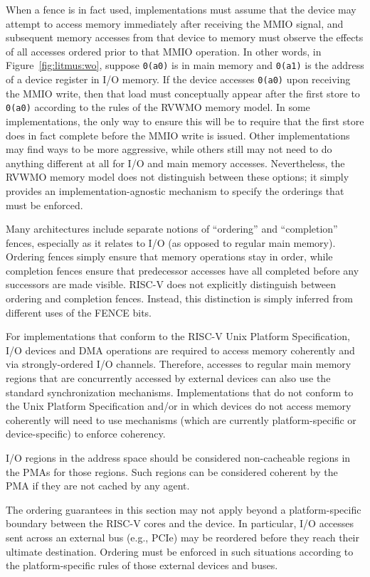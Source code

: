 When a fence is in fact used, implementations must assume that the device may attempt to access memory immediately after receiving the MMIO signal, and subsequent memory accesses from that device to memory must observe the effects of all accesses ordered prior to that MMIO operation.
In other words, in Figure~\ref{fig:litmus:wo}, suppose {\tt 0(a0)} is in main memory and {\tt 0(a1)} is the address of a device register in I/O memory.
If the device accesses {\tt 0(a0)} upon receiving the MMIO write, then that load must conceptually appear after the first store to {\tt 0(a0)} according to the rules of the RVWMO memory model.
In some implementations, the only way to ensure this will be to require that the first store does in fact complete before the MMIO write is issued.
Other implementations may find ways to be more aggressive, while others still may not need to do anything different at all for I/O and main memory accesses.
Nevertheless, the RVWMO memory model does not distinguish between these options; it simply provides an implementation-agnostic mechanism to specify the orderings that must be enforced.

Many architectures include separate notions of ``ordering'' and ``completion'' fences, especially as it relates to I/O (as opposed to regular main memory).
Ordering fences simply ensure that memory operations stay in order, while completion fences ensure that predecessor accesses have all completed before any successors are made visible.
RISC-V does not explicitly distinguish between ordering and completion fences.
Instead, this distinction is simply inferred from different uses of the FENCE bits.

For implementations that conform to the RISC-V Unix Platform Specification, I/O devices and DMA operations are required to access memory coherently and via strongly-ordered I/O channels.
Therefore, accesses to regular main memory regions that are concurrently accessed by external devices can also use the standard synchronization mechanisms.
Implementations that do not conform to the Unix Platform Specification and/or in which devices do not access memory coherently will need to use mechanisms (which are currently platform-specific or device-specific) to enforce coherency.

I/O regions in the address space should be considered non-cacheable regions in the PMAs for those regions.  Such regions can be considered coherent by the PMA if they are not cached by any agent.

The ordering guarantees in this section may not apply beyond a platform-specific boundary between the RISC-V cores and the device.  In particular, I/O accesses sent across an external bus (e.g., PCIe) may be reordered before they reach their ultimate destination.  Ordering must be enforced in such situations according to the platform-specific rules of those external devices and buses.


